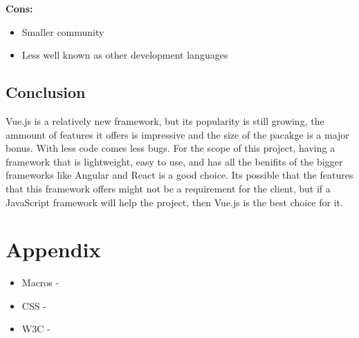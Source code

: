 \documentclass[draftclsnofoot,onecolumn,letterpaper,10pt,compsoc]{IEEEtran}
\begin{document}
    \textbf{Cons:}
    \begin{itemize}
      \item Smaller community
      \item Less well known as other development languages
    \end{itemize}

  \subsection{Conclusion}
  Vue.js is a relatively new framework, but its popularity is still growing, the ammount of features it offers is impressive and the size of the pacakge is a major bonus.
  With less code comes less bugs.
  For the scope of this project, having a framework that is lightweight, easy to use, and has all the benifits of the bigger frameworks like Angular and React is a good choice.
  Its possible that the features that this framework offers might not be a requirement for the client, but if a JavaScript framework will help the project, then Vue.js is the best choice for it.

\section{Appendix}

\begin{itemize}
  \item Macros -
  \item CSS -
  \item W3C -
\end{itemize}


\clearpage


{}

\end{document}
